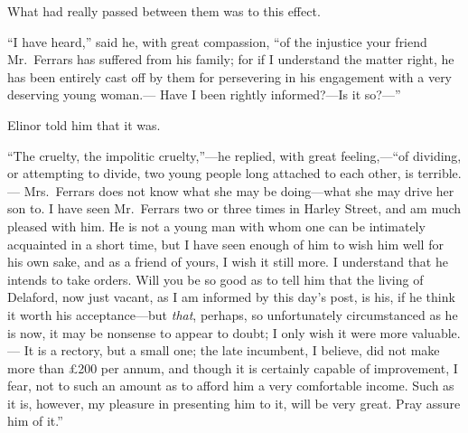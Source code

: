 What had really passed between them was to this effect.

``I have heard,'' said he, with great compassion,
``of the injustice your friend Mr.\ Ferrars has suffered
from his family; for if I understand the matter right,
he has been entirely cast off by them for persevering
in his engagement with a very deserving young woman.---%
Have I been rightly informed?---Is it so?---''

Elinor told him that it was.

``The cruelty, the impolitic cruelty,''---he replied,
with great feeling,---``of dividing, or attempting to divide,
two young people long attached to each other, is terrible.---%
Mrs.\ Ferrars does not know what she may be doing---what
she may drive her son to.  I have seen Mr.\ Ferrars two
or three times in Harley Street, and am much pleased
with him.  He is not a young man with whom one can
be intimately acquainted in a short time, but I have
seen enough of him to wish him well for his own sake,
and as a friend of yours, I wish it still more.
I understand that he intends to take orders.  Will you
be so good as to tell him that the living of Delaford,
now just vacant, as I am informed by this day's post,
is his, if he think it worth his acceptance---but \emph{that},
perhaps, so unfortunately circumstanced as he is now,
it may be  nonsense to appear to doubt; I only wish it
were more  valuable.--- It is a rectory, but a small one;
the late incumbent, I believe, did not make more than
\pounds 200 per annum, and though it is certainly capable
of improvement, I fear, not to such an amount as
to afford him a very comfortable income.  Such as it is,
however, my pleasure in presenting him to it,
will be very great.  Pray assure him of it.''

